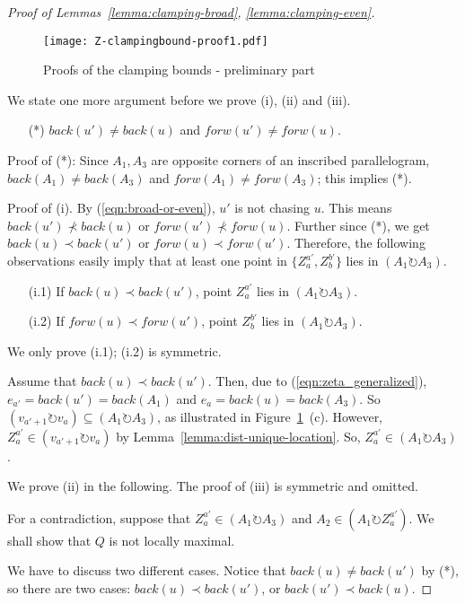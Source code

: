 \documentclass{ws-ijcga}
\begin{document}
\begin{proof}[Proof of Lemmas~\ref{lemma:clamping-broad}, \ref{lemma:clamping-even}]
\begin{figure}[h]
\centering\texttt{[image: Z-clampingbound-proof1.pdf]}
\caption{Proofs of the clamping bounds - preliminary part}\label{fig:PC1}
\end{figure}

\smallskip We state one more argument before we prove (i), (ii) and (iii).
\begin{enumerate}
\item[(*)] $back(u')\neq back(u)$ and $forw(u')\neq forw(u)$.
\end{enumerate}

\noindent
Proof of (*):  Since $A_1,A_3$ are opposite corners of an inscribed parallelogram,
$back(A_1)\neq back(A_3)$ and $forw(A_1)\neq forw(A_3)$; this implies (*).

\medskip \noindent
Proof of (i). By (\ref{eqn:broad-or-even}), $u'$ is not chasing $u$.
This means $back(u')\nprec back(u)$ or $forw(u')\nprec forw(u)$.
Further since (*), we get $back(u)\prec back(u')$ or $forw(u)\prec forw(u')$.
Therefore, the following observations easily imply that at least one point in $\{Z_a^{a'},Z_b^{b'}\}$ lies in $(A_1 \circlearrowright A_3)$.
\begin{enumerate}
\item[(i.1)] If $back(u)\prec back(u')$, point $Z_a^{a'}$ lies in $(A_1 \circlearrowright A_3)$.
\item[(i.2)] If $forw(u)\prec forw(u')$, point $Z_b^{b'}$ lies in $(A_1 \circlearrowright A_3)$.
\end{enumerate}

We only prove (i.1); (i.2) is symmetric.

Assume that $back(u)\prec back(u')$. Then, due to (\ref{eqn:zeta_generalized}),
$e_{a'}=back(u')=back(A_1)$ and $e_a=back(u)=back(A_3)$. So $(v_{a'+1}\circlearrowright v_a)\subseteq (A_1 \circlearrowright A_3)$, as illustrated in Figure~\ref{fig:PC1}~(c).
However, $Z_a^{a'}\in (v_{a'+1}\circlearrowright v_a)$ by Lemma~\ref{lemma:dist-unique-location}.
So, $Z_a^{a'}\in (A_1 \circlearrowright A_3)$.

\medskip \noindent We prove (ii) in the following. The proof of (iii) is symmetric and omitted.

For a contradiction, suppose that $Z_{a}^{a'}\in (A_1 \circlearrowright A_3)$ and $A_2\in(A_1 \circlearrowright Z_{a}^{a'})$.
We shall show that $Q$ is not locally maximal.

We have to discuss two different cases.
Notice that $back(u)\neq back(u')$ by (*), so there are two cases:
$back(u)\prec back(u')$, or $back(u')\prec back(u)$.


\end{proof}
\end{document}
